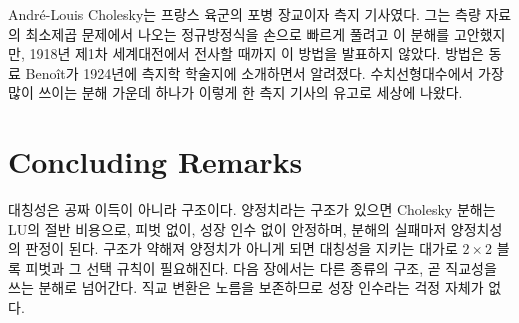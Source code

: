 \begin{aside}[측지 기사 Cholesky]
André-Louis Cholesky는 프랑스 육군의 포병 장교이자 측지 기사였다. 그는 측량 자료의 최소제곱 문제에서 나오는 정규방정식을 손으로 빠르게 풀려고 이 분해를 고안했지만, 1918년 제1차 세계대전에서 전사할 때까지 이 방법을 발표하지 않았다. 방법은 동료 Benoît가 1924년에 측지학 학술지에 소개하면서 알려졌다\cite{benoit1924}. 수치선형대수에서 가장 많이 쓰이는 분해 가운데 하나가 이렇게 한 측지 기사의 유고로 세상에 나왔다.
\end{aside}

\section{Concluding Remarks}

대칭성은 공짜 이득이 아니라 구조이다. 양정치라는 구조가 있으면 Cholesky 분해는 LU의 절반 비용으로, 피벗 없이, 성장 인수 없이 안정하며, 분해의 실패마저 양정치성의 판정이 된다. 구조가 약해져 양정치가 아니게 되면 대칭성을 지키는 대가로 $2\times2$ 블록 피벗과 그 선택 규칙이 필요해진다. 다음 장에서는 다른 종류의 구조, 곧 직교성을 쓰는 분해로 넘어간다. 직교 변환은 노름을 보존하므로 성장 인수라는 걱정 자체가 없다.

\chapterreferences
